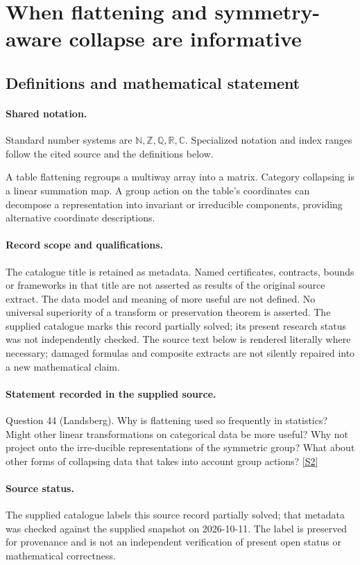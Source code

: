 \documentclass[11pt]{article}
\newcommand{\sref}[2]{\hyperlink{source:#1:#2}{[S#2]}}
\begin{document}
\section{When flattening and symmetry-aware collapse are informative}\label{statement}

\subsection{Definitions and mathematical statement}

\paragraph{Shared notation.}Standard number systems are $\mathbb N,\mathbb Z,\mathbb Q,\mathbb R,\mathbb C$. Specialized notation and index ranges follow the cited source and the definitions below.


A table flattening regroups a multiway array into a matrix. Category collapsing is a linear summation map. A group action on the table's coordinates can decompose a representation into invariant or irreducible components, providing alternative coordinate descriptions.
\paragraph{Record scope and qualifications.}
The catalogue title is retained as metadata. Named certificates, contracts, bounds or frameworks in that title are not asserted as results of the original source extract.
The data model and meaning of more useful are not defined. No universal superiority of a transform or preservation theorem is asserted. The supplied catalogue marks this record partially solved; its present research status was not independently checked.
The source text below is rendered literally where necessary; damaged formulas and composite extracts are not silently repaired into a new mathematical claim.
\paragraph{Statement recorded in the supplied source.}
Question 44 (Landsberg). Why is flattening used so frequently in statistics? Might other linear transformations on categorical data be more useful? Why not project onto the irre-ducible representations of the symmetric group? What about other forms of collapsing data that takes into account group actions? \sref{statement}{2}
\paragraph{Source status.}
The supplied catalogue labels this source record partially solved; that metadata was checked against the supplied snapshot on 2026-10-11. The label is preserved for provenance and is not an independent verification of present open status or mathematical correctness.
\end{document}
